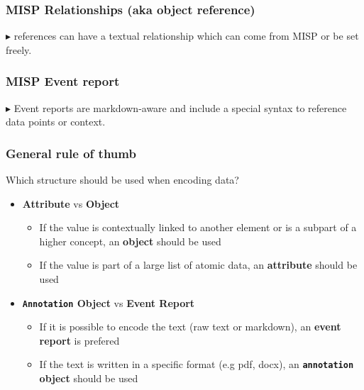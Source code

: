 \begin{frame}
    \frametitle{MISP Relationships (aka object reference)}

        {
            $\blacktriangleright$ references can have a textual relationship which can come from MISP or be set freely.
        }
\end{frame}

\begin{frame}
    \frametitle{MISP Event report}

        {
            $\blacktriangleright$ Event reports are markdown-aware and include a special syntax to reference data points or context.
        }
\end{frame}


\begin{frame}
    \frametitle{General rule of thumb}

    Which structure should be used when encoding data?
    \begin{itemize}
        \item \textbf{Attribute} vs \textbf{Object}
        \begin{itemize}
            \item If the value is contextually linked to another element or is a subpart of a higher concept, an \textbf{object} should be used
            \item If the value is part of a large list of atomic data, an \textbf{attribute} should be used
        \end{itemize}
        \item \textbf{\texttt{Annotation} Object} vs \textbf{Event Report}
        \begin{itemize}
            \item If it is possible to encode the text (raw text or markdown), an \textbf{event report} is prefered
            \item If the text is written in a specific format (e.g pdf, docx), an \textbf{\texttt{annotation} object} should be used
        \end{itemize}
    \end{itemize}
\end{frame}

